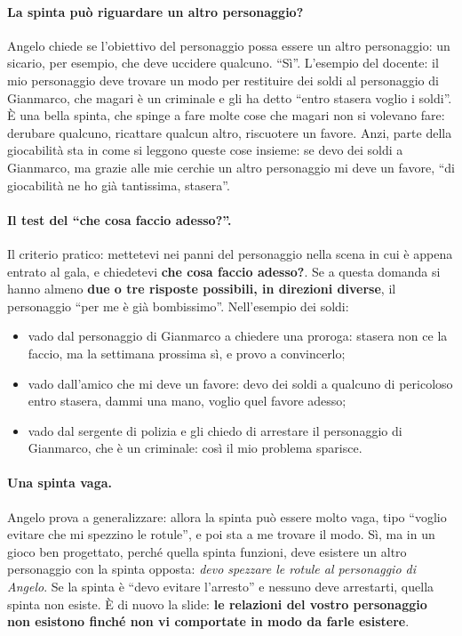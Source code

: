 \paragraph{La spinta può riguardare un altro personaggio?} Angelo chiede se
l'obiettivo del personaggio possa essere un altro personaggio: un sicario, per
esempio, che deve uccidere qualcuno. ``Sì''. L'esempio del docente: il mio personaggio
deve trovare un modo per restituire dei soldi al personaggio di Gianmarco, che
magari è un criminale e gli ha detto ``entro stasera voglio i soldi''. È una bella
spinta, che spinge a fare molte cose che magari non si volevano fare: derubare
qualcuno, ricattare qualcun altro, riscuotere un favore. Anzi, parte della giocabilità
sta in come si leggono queste cose insieme: se devo dei soldi a Gianmarco, ma grazie
alle mie cerchie un altro personaggio mi deve un favore, ``di giocabilità ne ho già
tantissima, stasera''.

\paragraph{Il test del ``che cosa faccio adesso?''.} Il criterio pratico: mettetevi
nei panni del personaggio nella scena in cui è appena entrato al gala, e chiedetevi
\textbf{che cosa faccio adesso?}. Se a questa domanda si hanno almeno \textbf{due o
tre risposte possibili, in direzioni diverse}, il personaggio ``per me è già
bombissimo''. Nell'esempio dei soldi:
\begin{itemize}
  \item vado dal personaggio di Gianmarco a chiedere una proroga: stasera non ce la
        faccio, ma la settimana prossima sì, e provo a convincerlo;
  \item vado dall'amico che mi deve un favore: devo dei soldi a qualcuno di
        pericoloso entro stasera, dammi una mano, voglio quel favore adesso;
  \item vado dal sergente di polizia e gli chiedo di arrestare il personaggio di
        Gianmarco, che è un criminale: così il mio problema sparisce.
\end{itemize}

\paragraph{Una spinta vaga.} Angelo prova a generalizzare: allora la spinta può essere
molto vaga, tipo ``voglio evitare che mi spezzino le rotule'', e poi sta a me trovare
il modo. Sì, ma in un gioco ben progettato, perché quella spinta funzioni, deve
esistere un altro personaggio con la spinta opposta: \emph{devo spezzare le rotule al
personaggio di Angelo}. Se la spinta è ``devo evitare l'arresto'' e nessuno deve
arrestarti, quella spinta non esiste. È di nuovo la slide: \textbf{le relazioni del
vostro personaggio non esistono finché non vi comportate in modo da farle esistere}.

